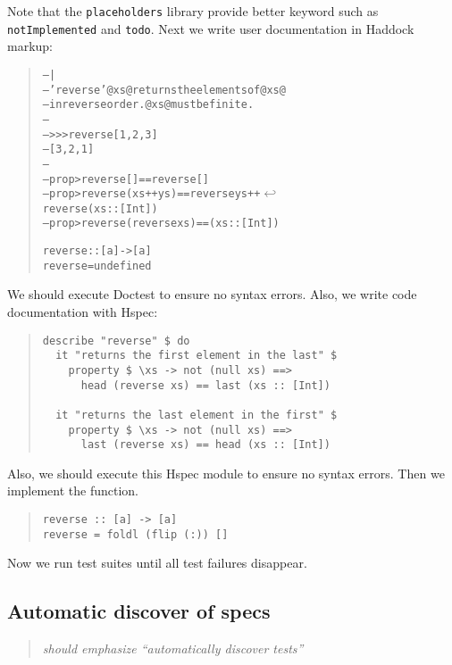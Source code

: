 \documentclass[preprint]{sigplanconf}
\begin{document}
\noindent Note that the {\tt placeholders} library provide better keyword such as {\tt notImplemented} and {\tt todo}.
Next we write user documentation in Haddock markup:

\begin{quote}
\small
\begin{alltt}
-- |
-- 'reverse' @xs@ returns the elements of @xs@
-- in reverse order. @xs@ must be finite.
--
-- >>> reverse [1,2,3]
-- [3,2,1]
--
-- prop> reverse [] == reverse []
-- prop> reverse (xs ++ ys) == reverse ys ++ \(\hookleftarrow\)
                               reverse (xs::[Int])
-- prop> reverse (reverse xs) == (xs::[Int])

reverse :: [a] -> [a]
reverse = undefined
\end{alltt}
\end{quote}

\noindent We should execute Doctest to ensure no syntax errors.
Also, we write code documentation with Hspec:

\begin{quote}
\small
\begin{verbatim}
describe "reverse" $ do
  it "returns the first element in the last" $
    property $ \xs -> not (null xs) ==>
      head (reverse xs) == last (xs :: [Int])

  it "returns the last element in the first" $
    property $ \xs -> not (null xs) ==>
      last (reverse xs) == head (xs :: [Int])
\end{verbatim}
\end{quote}

\noindent Also, we should execute this Hspec module
to ensure no syntax errors.
Then we implement the function.

\begin{quote}
\small
\begin{verbatim}
reverse :: [a] -> [a]
reverse = foldl (flip (:)) []
\end{verbatim}
\end{quote}

\noindent Now we run test suites until
all test failures disappear.

\subsection{Automatic discover of specs}

\begin{quote}
    \emph{should emphasize ``automatically discover tests''}
\end{quote}
\end{document}
